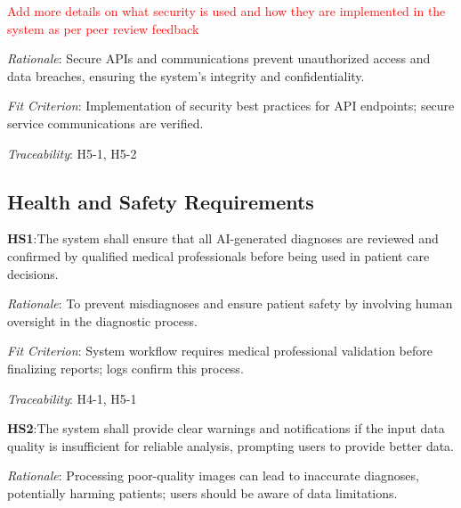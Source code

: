 \documentclass{article}
\begin{document}
\textcolor{red}{Add more details on what security is used and how they are implemented in the system as per peer review feedback}
\vspace{0.2cm}

\emph{Rationale}: Secure APIs and communications prevent unauthorized access and data breaches, ensuring the system's integrity and confidentiality.

\vspace{0.2cm}

\emph{Fit Criterion}: Implementation of security best practices for API endpoints; secure service communications are verified.

\vspace{0.2cm}

\emph{Traceability}: H5-1, H5-2

\vspace{0.5cm}

\subsection{Health and Safety Requirements}

\hspace{0.5cm}\textbf{HS1}:\hypertarget{HS1}{The system shall ensure that all AI-generated diagnoses are reviewed and confirmed by qualified medical professionals before being used in patient care decisions.}
\vspace{0.2cm}

\emph{Rationale}: To prevent misdiagnoses and ensure patient safety by involving human oversight in the diagnostic process.

\vspace{0.2cm}

\emph{Fit Criterion}: System workflow requires medical professional validation before finalizing reports; logs confirm this process.

\vspace{0.2cm}

\emph{Traceability}: H4-1, H5-1

\vspace{0.5cm}

\textbf{HS2}:\hypertarget{HS2}{The system shall provide clear warnings and notifications if the input data quality is insufficient for reliable analysis, prompting users to provide better data.}
\vspace{0.2cm}

\emph{Rationale}: Processing poor-quality images can lead to inaccurate diagnoses, potentially harming patients; users should be aware of data limitations.
\end{document}
